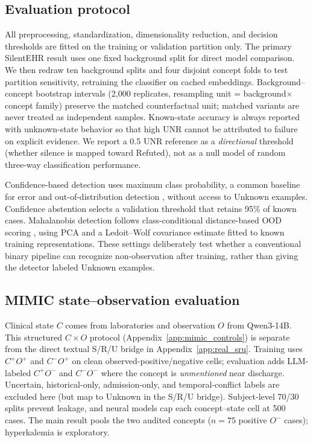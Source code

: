 \documentclass[11pt]{article}
\begin{document}
\subsection{Evaluation protocol}
All preprocessing, standardization, dimensionality reduction, and decision
thresholds are fitted on the training or validation partition only. The primary
SilentEHR result uses one fixed background split for direct model comparison.
We then redraw ten background splits and four disjoint concept folds to test
partition sensitivity, retraining the classifier on cached embeddings.
Background--concept bootstrap intervals (2{,}000 replicates, resampling unit =
background$\times$concept family) preserve the matched counterfactual
unit; matched variants are never treated as independent samples.
Known-state accuracy is always reported with unknown-state behavior so
that high UNR cannot be attributed to failure on explicit evidence.
We report a 0.5 UNR reference as a \emph{directional} threshold (whether
silence is mapped toward Refuted), not as a null model of random
three-way classification performance.

Confidence-based detection uses maximum class probability, a common baseline
for error and out-of-distribution detection \citep{hendrycks-gimpel-2017-baseline},
without access to Unknown examples. Confidence abstention selects a validation threshold
that retains 95\% of known cases. Mahalanobis detection follows class-conditional distance-based OOD scoring
\citep{lee-etal-2018-mahalanobis}, using PCA and a Ledoit--Wolf covariance
estimate fitted to known training representations. These
settings deliberately test whether a conventional binary pipeline can recognize
non-observation after training, rather than giving the detector labeled Unknown
examples.

\subsection{MIMIC state--observation evaluation}
Clinical state $C$ comes from laboratories and observation $O$ from Qwen3-14B.
This structured $C\times O$ protocol (Appendix~\ref{app:mimic_controls}) is
separate from the direct textual S/R/U bridge in Appendix~\ref{app:real_sru}.
Training uses $C^+O^+$ and $C^-O^+$ on clean observed-positive/negative cells;
evaluation adds LLM-labeled $C^+O^-$ and $C^-O^-$ where the concept is
\emph{unmentioned} near discharge. Uncertain, historical-only, admission-only,
and temporal-conflict labels are excluded here (but map to Unknown in the S/R/U
bridge). Subject-level 70/30 splits prevent leakage, and neural models cap each
concept--state cell at 500 cases. The main result pools the two audited concepts
($n=75$ positive $O^-$ cases); hyperkalemia is exploratory.
\end{document}
